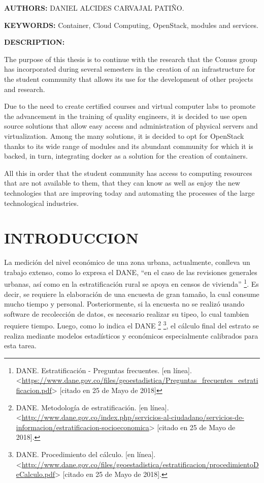     \textbf{AUTHORS:} DANIEL ALCIDES CARVAJAL PATIÑO.
    
    \textbf{KEYWORDS:} Container, Cloud Computing, OpenStack, modules and services.
    
    \textbf{DESCRIPTION:} 
    
    The purpose of this thesis is to continue with the research that the Conuss group has incorporated during several semesters in the creation of an infrastructure for the student community that allows its use for the development of other projects and research.
    
    Due to the need to create certified courses and virtual computer labs to promote the advancement in the training of quality engineers, it is decided to use open source solutions that allow easy access and administration of physical servers and virtualization. Among the many solutions, it is decided to opt for OpenStack thanks to its wide range of modules and its abundant community for which it is backed, in turn, integrating docker as a solution for the creation of containers.
    
    All this in order that the student community has access to computing resources that are not available to them, that they can know as well as enjoy the new technologies that are improving today and automating the processes of the large technological industries.
    
    
	\newpage\chapter*{INTRODUCCION}
    La medición del nivel económico de una zona urbana, actualmente, conlleva un trabajo extenso, como lo expresa el DANE, “en el caso de las revisiones generales urbanas, así como en la estratificación rural se apoya en censos de vivienda”    
    \footnote{DANE. Estratificación - Preguntas frecuentes. [en línea]. 
    		<\url{https://www.dane.gov.co/files/geoestadistica/Preguntas_frecuentes_estratificacion.pdf}> [citado en 25 de Mayo de 2018]}.
    Es decir, se requiere la elaboración de una encuesta de gran tamaño, la cual consume mucho tiempo y personal. Posteriormente, si la encuesta no se realizó usando software de recolección de datos, es necesario realizar su tipeo, lo cual tambien requiere tiempo. Luego, como lo indica el DANE
    \footnote{DANE. Metodología de estratificación. [en línea].
    	 <\url{http://www.dane.gov.co/index.php/servicios-al-ciudadano/servicios-de-informacion/estratificacion-socioeconomica}> [citado en 25 de Mayo de 2018].}
    \footnote{DANE. Procedimiento del cálculo. [en línea]. <\url{http://www.dane.gov.co/files/geoestadistica/estratificacion/procedimientoDeCalculo.pdf}> [citado en 25 de Mayo de 2018].}, el cálculo final del estrato se realiza mediante modelos estadísticos y económicos especialmente calibrados para esta tarea.
    
